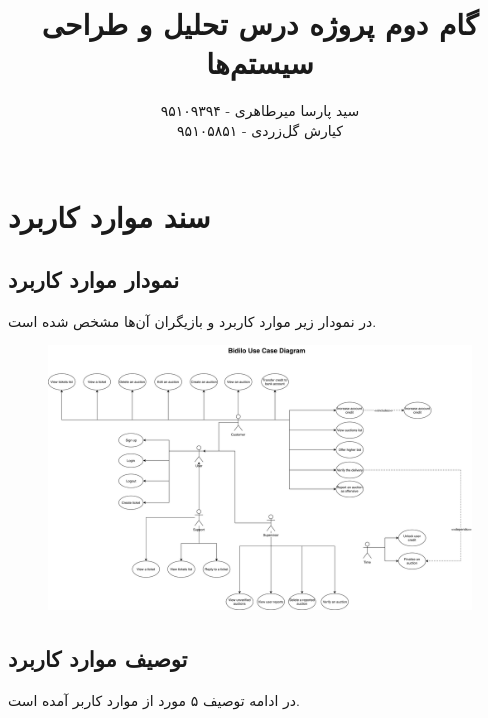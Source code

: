 \documentclass{article}
\title{\textbf{گام دوم پروژه درس تحلیل و طراحی سیستم‌ها}}
\author{سید پارسا میرطاهری - ۹۵۱۰۹۳۹۴ \\ کیارش گل‌زردی - ۹۵۱۰۵۸۵۱}
\begin{document}
\date{}

\maketitle

\section{سند موارد کاربرد}

\subsection{نمودار موارد کاربرد}

در نمودار زیر موارد کاربرد و بازیگران آن‌ها مشخص شده است.

\begin{figure}[htp]
\includegraphics[width = 1\textwidth]{../Use case Diagram/Use case Diagram.png}
\caption{}
\label{usecase}
\end{figure}
\subsection{توصیف موارد کاربرد}

در ادامه توصیف ۵ مورد از موارد کاربر آمده است.
\end{document}
